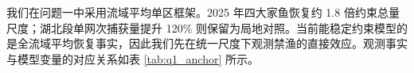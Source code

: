 我们在问题一中采用流域平均单区框架。2025 年四大家鱼恢复约 1.8 倍约束总量尺度；湖北段单网次捕获量提升 120\% 则保留为局地对照。当前能稳定约束模型的是全流域平均恢复事实，因此我们先在统一尺度下观测禁渔的直接效应。观测事实与模型变量的对应关系如表 \ref{tab:q1_anchor} 所示。
